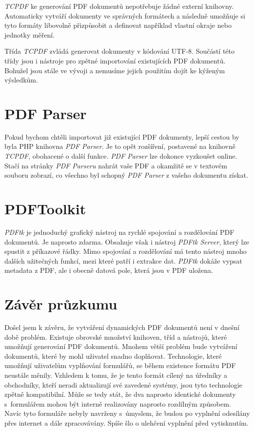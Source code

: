 \documentclass[czech,BP]{thesiskiv}
\begin{document}
\emph{TCPDF} ke generování PDF dokumentů nepotřebuje žádné externí knihovny. Automaticky vytváří dokumenty ve správných formátech a následně umožňuje si tyto formáty libovolně přizpůsobit a definovat například vlastní okraje nebo jednotky měření. 

Třída \emph{TCPDF} zvládá generovat dokumenty v kódování UTF-8. Součástí této třídy jsou i nástroje pro zpětné importování existujících PDF dokumentů. Bohužel jsou stále ve vývoji a nemusíme jejich použitím dojít ke kýženým výsledkům. \cite{TCPDF} \cite{FPDF_Book}
\section{PDF Parser}
Pokud bychom chtěli importovat již existující PDF dokumenty, lepší cestou by byla PHP knihovna \emph{PDF Parser}. Je to opět rozšíření, postavené na knihovně \emph{TCPDF}, obohacené o další funkce. \emph{PDF Parser} lze dokonce vyzkoušet online. Stačí na stránky \emph{PDF Parseru} nahrát vaše PDF a okamžitě se v textovém souboru zobrazí, co všechno byl schopný \emph{PDF Parser} z vašeho dokumentu získat\cite{PDF_Parser}. 
\section{PDFToolkit}
\emph{PDFtk} je jednoduchý grafický nástroj na rychlé spojování a rozdělování PDF dokumentů. Je naprosto zdarma. Obsahuje však i nástroj \emph{PDFtk Server}, který lze spustit z příkazové řádky. Mimo spojování a rozdělování má tento nástroj mnoho dalších užitečných funkcí, mezi které patří i extrakce dat. \emph{PDFtk} dokáže vypsat metadata z PDF, ale i obecně datová pole, která jsou v PDF uložena\cite{PDF_Toolkit}.
\section{Závěr průzkumu}
Došel jsem k závěru, že vytváření dynamických PDF dokumentů není v dnešní době problém. Existuje obrovské množství knihoven, tříd a nástrojů, které umožňují generování PDF dokumentů. Mnohem větší problém bude vytváření dokumentů, které by mohl uživatel snadno doplňovat. Technologie, které umožňují uživatelům vyplňování formulářů, se během existence formátu PDF neustále měnily. Vzhledem k tomu, že je tento formát cílený na úředníky a obchodníky, kteří neradi aktualizují své zavedené systémy, jsou tyto technologie zpětně kompatibilní. Může se tedy stát, že dva naprosto identické dokumenty s~formulářem mohou být interně realizovány naprosto rozdílným způsobem. Navíc tyto formuláře nebyly navrženy s~úmyslem, že budou po vyplnění odesílány přes internet a dále zpracovávány. Spíše šlo o ulehčení vyplnění před vytisknutím. 
\end{document}
